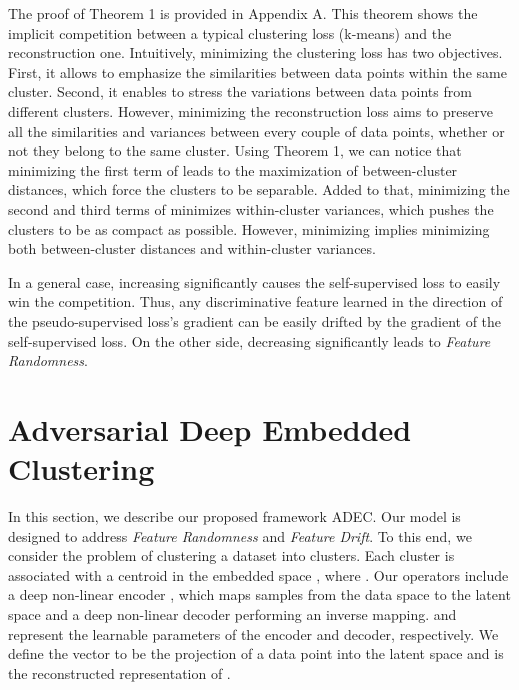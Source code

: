 \documentclass{article}
\begin{document}
The proof of Theorem 1 is provided in Appendix A. This theorem shows the implicit competition between a typical clustering loss (k-means) and the reconstruction one. Intuitively, minimizing the clustering loss has two objectives. First, it allows to emphasize the similarities between data points within the same cluster. Second, it enables to stress the variations between data points from different clusters. However, minimizing the reconstruction loss aims to preserve all the similarities and variances between every couple of data points, whether or not they belong to the same cluster. Using Theorem 1, we can notice that minimizing the first term of  leads to the maximization of between-cluster distances, which force the clusters to be separable. Added to that, minimizing the second and third terms of   minimizes within-cluster variances, which pushes the clusters to be as compact as possible. However, minimizing  implies minimizing both between-cluster distances and within-cluster variances.

In a general case, increasing  significantly causes the self-supervised loss to easily win the competition. Thus, any discriminative feature learned in the direction of the pseudo-supervised loss's gradient can be easily drifted by the gradient of the self-supervised loss. On the other side, decreasing  significantly leads to \textit{Feature Randomness}.

\section{Adversarial Deep Embedded Clustering}
In this section, we describe our proposed framework ADEC. Our model is designed to address \textit{Feature Randomness} and \textit{Feature Drift}. To this end, we consider the problem of clustering a dataset  into  clusters. Each cluster is associated with a centroid  in the embedded space , where . Our operators include a deep non-linear encoder , which maps samples from the data space to the latent space and a deep non-linear decoder  performing an inverse mapping.  and  represent the learnable parameters of the encoder and decoder, respectively. We define the vector  to be the projection of a data point  into the latent space and  is the reconstructed representation of . 
\end{document}
